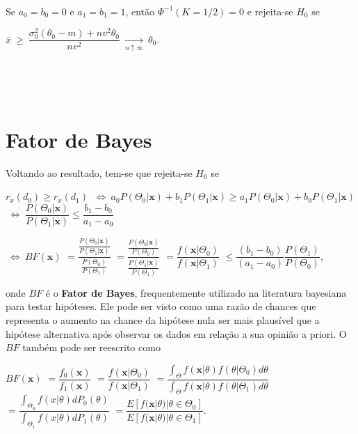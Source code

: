 \documentclass[
]{book}
\begin{document}
\(~\)

Se \(a_0=b_0=0\) e \(a_1=b_1=1\), então \(\Phi^{-1}(K=1/2)=0\) e rejeita-se \(H_0\) se

\(\bar x ~\geq~ \dfrac{{\sigma}_0^2(\theta_0-m)+nv^2\theta_0}{nv^2} ~\underset{n\uparrow\infty}{\longrightarrow}~ \theta_0\).

\(~\)

\(~\)

\hypertarget{fator-de-bayes}{%
\section{Fator de Bayes}\label{fator-de-bayes}}

Voltando ao resultado, tem-se que rejeita-se \(H_0\) se

\(r_x(d_0) \geq r_x(d_1)\)
\(~\Longleftrightarrow~ a_0P(\Theta_0|\boldsymbol x)+b_1P(\Theta_1|\boldsymbol x) \geq a_1P(\Theta_0|\boldsymbol x)+b_0P(\Theta_1|\boldsymbol x)\)
\(~\Longleftrightarrow~ \dfrac{P(\Theta_0|\boldsymbol x)}{P(\Theta_1|\boldsymbol x)}\leq\dfrac{b_1-b_0}{a_1-a_0}\)

\(~\Longleftrightarrow~ BF(\boldsymbol x)\) \(=\dfrac{\frac{P(\Theta_0|\boldsymbol x)}{P(\Theta_1|\boldsymbol x)}}{\frac{P(\Theta_0)}{P(\Theta_1)}}\) \(=\dfrac{\frac{P(\Theta_0|\boldsymbol x)}{P(\Theta_0)}}{\frac{P(\Theta_1|\boldsymbol x)}{P(\Theta_1)}}\)
\(=\dfrac{f(\boldsymbol x | \Theta_0)}{f(\boldsymbol x | \Theta_1)}\)
\(\leq \dfrac{(b_1-b_0)}{(a_1-a_0)}\dfrac{P(\Theta_1)}{P(\Theta_0)}\),

onde \(BF\) é o \textbf{Fator de Bayes}, frequentemente utilizado na literatura bayesiana para testar hipóteses. Ele pode ser visto como uma razão de chances que representa o aumento na chance da hipótese nula ser mais plausível que a hipótese alternativa após observar os dados em relação a sua opinião a priori. O \(BF\) também pode ser reescrito como

\(BF(\boldsymbol x)\)
\(=\dfrac{f_0(\boldsymbol x)}{f_1(\boldsymbol x)}\)
\(=\dfrac{f(\boldsymbol x | \Theta_0)}{f(\boldsymbol x | \Theta_1)}\)
\(=\dfrac{\displaystyle \int_{\Theta}f(\boldsymbol x|\theta) f(\theta|\Theta_0) d\theta} {\displaystyle \int_{\Theta} f(\boldsymbol x|\theta)f(\theta|\Theta_1)d\theta}\)
\(=\dfrac{\displaystyle \int_{\Theta_0}f(x|\theta)dP_0(\theta)}{\displaystyle \int_{\Theta_1}f(x|\theta)dP_1(\theta)}\)
\(=\dfrac{E\left[f(\boldsymbol x|\theta)|\theta\in\Theta_0\right]}{E\left[f(\boldsymbol x|\theta)|\theta \in \Theta_1\right]}\).

\(~\)
\end{document}

